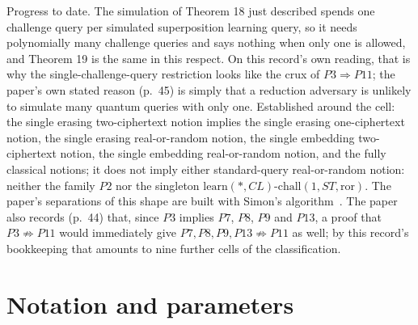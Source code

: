 \documentclass{conjura-conjecture}
\newcommand{\ror}{\mathrm{ror}}
\newcommand{\learn}{\mathrm{learn}}
\newcommand{\chall}{\mathrm{chall}}
\begin{document}
Progress to date. The simulation of Theorem 18 just described spends one
challenge query per simulated superposition learning query, so it needs
polynomially many challenge queries and says nothing when only one is
allowed, and Theorem 19 is the same in this respect. On this record's
own reading, that is why the single-challenge-query restriction looks
like the crux of $P3\Rightarrow P11$; the
paper's own stated reason (p.~45) is simply that a reduction adversary
is unlikely to simulate many quantum queries with only one. Established
around the cell: the single erasing two-ciphertext notion implies the
single erasing one-ciphertext notion, the single erasing real-or-random
notion, the single embedding two-ciphertext notion, the single embedding
real-or-random notion, and the fully classical notions; it does not
imply either standard-query real-or-random notion: neither the family
$P2$ nor the singleton $\learn(*,CL)$-$\chall(1,ST,\ror)$. The paper's
separations of this shape are built with Simon's algorithm~\cite{Sim97}.
The paper also records (p.~44) that, since $P3$ implies $P7$, $P8$, $P9$
and $P13$, a proof that $P3\not\Rightarrow P11$ would immediately give
$P7, P8, P9, P13\not\Rightarrow P11$ as well; by this record's
bookkeeping that amounts to nine further cells of the classification.

\section{Notation and parameters}\label{sec:notation}
\end{document}
